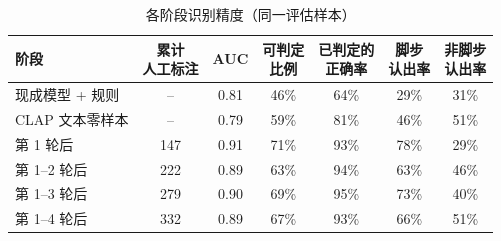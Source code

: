 \begin{table}[htbp]\centering
\caption{各阶段识别精度（同一评估样本）}\label{tab:b_stages}
{\small\begin{threeparttable}
\begin{tabular}{lcccccc}\toprule
阶段 & \makecell{累计\\人工标注} & AUC & \makecell{可判定\\比例} & \makecell{已判定的\\正确率} & \makecell{脚步\\认出率} & \makecell{非脚步\\认出率} \\
\midrule
现成模型 + 规则 & -- & 0.81 & 46\% & 64\% & 29\% & 31\% \\
CLAP 文本零样本 & -- & 0.79 & 59\% & 81\% & 46\% & 51\% \\
第 1 轮后 & 147 & 0.91 & 71\% & 93\% & 78\% & 29\% \\
第 1--2 轮后 & 222 & 0.89 & 63\% & 94\% & 63\% & 46\% \\
第 1--3 轮后 & 279 & 0.90 & 69\% & 95\% & 73\% & 40\% \\
第 1--4 轮后 & 332 & 0.89 & 67\% & 93\% & 66\% & 51\% \\
\bottomrule\end{tabular}
\end{threeparttable}}
\end{table}
